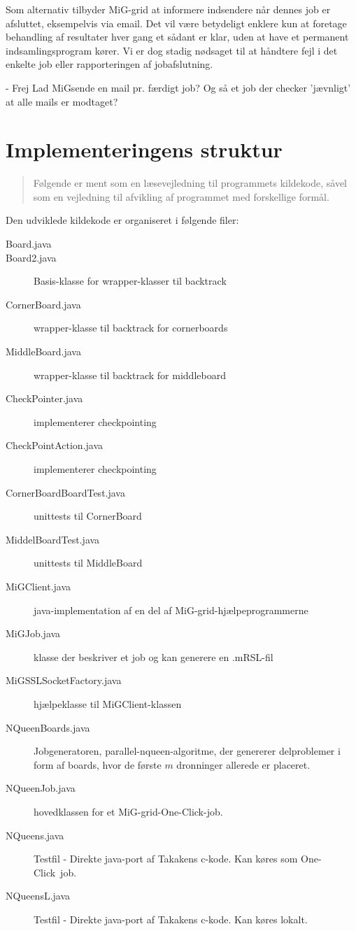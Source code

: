 \documentclass[pdf,draft,a4paper,11pt]{article}
\newcommand{\mig}{MiG}
\newcommand{\oc}{One-Click}
\begin{document}
Som alternativ tilbyder \mig-grid at informere indsendere når dennes job er afsluttet, eksempelvis via email. Det vil være betydeligt enklere kun at foretage behandling af resultater hver gang et sådant er klar, uden at have et permanent indsamlingsprogram kører. Vi er dog stadig nødsaget til at håndtere fejl i det enkelte job eller rapporteringen af jobafslutning. 

- Frej Lad \mig sende en mail pr. færdigt job? Og så et job der checker 'jævnligt' at alle mails er modtaget?



\section{Implementeringens struktur}\label{implementeringensstruktur}
\begin{verse}
	Følgende er ment som en læsevejledning til programmets kildekode, såvel som en vejledning til afvikling af programmet med forskellige formål. 
\end{verse}

Den udviklede kildekode er organiseret i følgende filer:
\begin{description}
	\item[Board.java] 
	\item[Board2.java] Basis-klasse for wrapper-klasser til backtrack
	\item[CornerBoard.java] wrapper-klasse til backtrack for cornerboards
	\item[MiddleBoard.java] wrapper-klasse til backtrack for middleboard
	\item[CheckPointer.java] implementerer checkpointing
	\item[CheckPointAction.java] implementerer checkpointing
	\item[CornerBoardBoardTest.java] unittests til CornerBoard
	\item[MiddelBoardTest.java] unittests til MiddleBoard
	\item[MiGClient.java] java-implementation af en del af \mig-grid-hjælpeprogrammerne
	\item[MiGJob.java] klasse der beskriver et job og kan generere en .mRSL-fil
	\item[MiGSSLSocketFactory.java] hjælpeklasse til MiGClient-klassen
	\item[NQueenBoards.java] Jobgeneratoren, parallel-nqueen-algoritme, der genererer delproblemer i form af boards, hvor de første $m$ dronninger allerede er placeret. 
	\item[NQueenJob.java] hovedklassen for et \mig-grid-\oc-job. 
	\item[NQueens.java] Testfil - Direkte java-port af Takakens c-kode. Kan køres som \oc\ job.
	\item[NQueensL.java] Testfil - Direkte java-port af Takakens c-kode. Kan køres lokalt.
\end{description}
\end{document}
